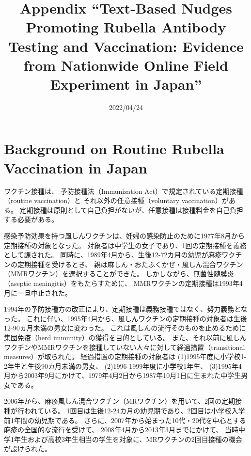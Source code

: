 \documentclass[
  11pt,
  a4paper,
]{article}
\title{Appendix
``Text-Based Nudges Promoting Rubella Antibody Testing and Vaccination:
Evidence from Nationwide Online Field Experiment in Japan''  }
\date{2022/04/24}
\begin{document}
\begin{spacing}{1}
  \maketitle
\end{spacing}

{
\setcounter{tocdepth}{2}
\tableofcontents
}
\clearpage

\hypertarget{appendix-appendix}{%
\appendix}


\hypertarget{background-on-routine-rubella-vaccination-in-japan}{%
\section{Background on Routine Rubella Vaccination in Japan}\label{background-on-routine-rubella-vaccination-in-japan}}

ワクチン接種は、
予防接種法（Immunization Act）で規定されている定期接種（routine vaccination）と
それ以外の任意接種（voluntary vaccination）がある。
定期接種は原則として自己負担がないが、任意接種は接種料金を自己負担する必要がある。

感染予防効果を持つ風しんワクチンは、妊婦の感染防止のために1977年8月から定期接種の対象となった。
対象者は中学生の女子であり、1回の定期接種を義務として課された。
同時に、1989年4月から、生後12-72カ月の幼児が麻疹ワクチンの定期接種を受けるとき、
親は麻しん・おたふくかぜ・風しん混合ワクチン（MMRワクチン）を選択することができた。
しかしながら、無菌性髄膜炎（aseptic meningitis）をもたらすために、
MMRワクチンの定期接種は1993年4月に一旦中止された。

1994年の予防接種方の改正により、定期接種は義務接種ではなく、努力義務となった。
これに伴い、1995年4月から、風しんワクチンの定期接種の対象者は生後12-90ヵ月未満の男女に変わった。
これは風しんの流行そのものを止めるために集団免疫（herd immunity）の獲得を目的としている。
また、それ以前に風しんワクチンやMMRワクチンを接種していない人々に対して経過措置（transitional measures）が取られた。
経過措置の定期接種の対象者は
(1)1995年度に小学校1-2年生と生後90カ月未満の男女、
(2)1996-1999年度に小学校1年生、
(3)1995年4月から2003年9月にかけて、1979年4月2日から1987年10月1日に生まれた中学生男女である。

2006年から、麻疹風しん混合ワクチン（MRワクチン）を用いて、2回の定期接種が行われている。
1回目は生後12-24カ月の幼児期であり、2回目は小学校入学前1年間の幼児期である。
さらに、2007年から始まった10代・20代を中心とする麻疹の全国的な流行を受けて、
2008年4月から2013年3月までにかけて、
当時中学1年生および高校3年生相当の学生を対象に、MRワクチンの2回目接種の機会が設けられた。
\end{document}
